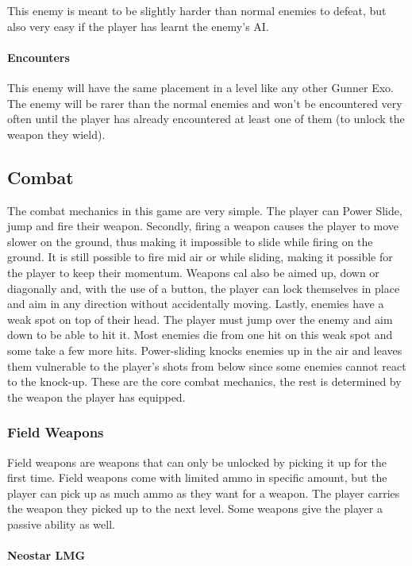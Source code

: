 \documentclass[12pt]{article}
\begin{document}
This enemy is meant to be slightly harder than normal enemies to defeat, but also very easy if the player has learnt the enemy's AI. 

\paragraph{Encounters}

This enemy will have the same placement in a level like any other Gunner Exo. The enemy will be rarer than the normal enemies and won't be encountered very often until the player has already encountered at least one of them (to unlock the weapon they wield). 

\subsection{Combat}

The combat mechanics in this game are very simple. The player can Power Slide, jump and fire their weapon. Secondly, firing a weapon causes the player to move slower on the ground, thus making it impossible to slide while firing on the ground. It is still possible to fire mid air or while sliding, making it possible for the player to keep their momentum. Weapons cal also be aimed up, down or diagonally and, with the use of a button, the player can lock themselves in place and aim in any direction without accidentally moving. Lastly, enemies have a weak spot on top of their head. The player must jump over the enemy and aim down to be able to hit it. Most enemies die from one hit on this weak spot and some take a few more hits. Power-sliding knocks enemies up in the air and leaves them vulnerable to the player's shots from below since some enemies cannot react to the knock-up.
These are the core combat mechanics, the rest is determined by the weapon the player has equipped.

\subsubsection{Field Weapons}

Field weapons are weapons that can only be unlocked by picking it up for the first time. Field weapons come with limited ammo in specific amount, but the player can pick up as much ammo as they want for a weapon. The player carries the weapon they picked up to the next level. Some weapons give the player a passive ability  as well. 

\paragraph{Neostar LMG}
\end{document}
